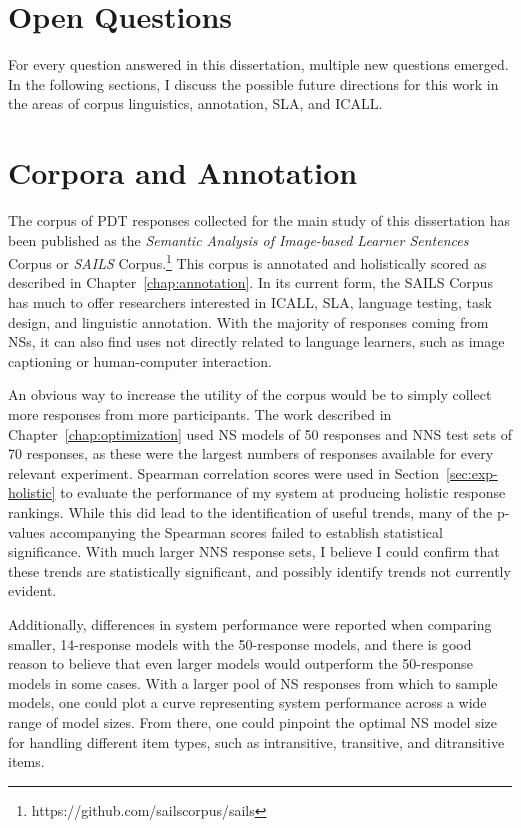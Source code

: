 \section{Open Questions}
\label{sec:conclusion-outlook}

For every question answered in this dissertation, multiple new questions emerged. In the following sections, I discuss the possible future directions for this work in the areas of corpus linguistics, annotation, SLA, and ICALL.

\section{Corpora and Annotation}
\label{sec:outlook-annotation}
The corpus of PDT responses collected for the main study of this dissertation has been published as the \textit{Semantic Analysis of Image-based Learner Sentences} Corpus or \textit{SAILS} Corpus.\footnote{https://github.com/sailscorpus/sails} This corpus is annotated and holistically scored as described in Chapter~\ref{chap:annotation}. In its current form, the SAILS Corpus has much to offer researchers interested in ICALL, SLA, language testing, task design, and linguistic annotation. With the majority of responses coming from NSs, it can also find uses not directly related to language learners, such as image captioning or human-computer interaction. 

An obvious way to increase the utility of the corpus would be to simply collect more responses from more participants. The work described in Chapter~\ref{chap:optimization} used NS models of 50 responses and NNS test sets of 70 responses, as these were the largest numbers of responses available for every relevant experiment. Spearman correlation scores were used in Section~\ref{sec:exp-holistic} to evaluate the performance of my system at producing holistic response rankings. While this did lead to the identification of useful trends, many of the p-values accompanying the Spearman scores failed to establish statistical significance. With much larger NNS response sets, I believe I could confirm that these trends are statistically significant, and possibly identify trends not currently evident.

Additionally, differences in system performance were reported when comparing smaller, 14-response models with the 50-response models, and there is good reason to believe that even larger models would outperform the 50-response models in some cases. With a larger pool of NS responses from which to sample models, one could plot a curve representing system performance across a wide range of model sizes. From there, one could pinpoint the optimal NS model size for handling different item types, such as intransitive, transitive, and ditransitive items.

